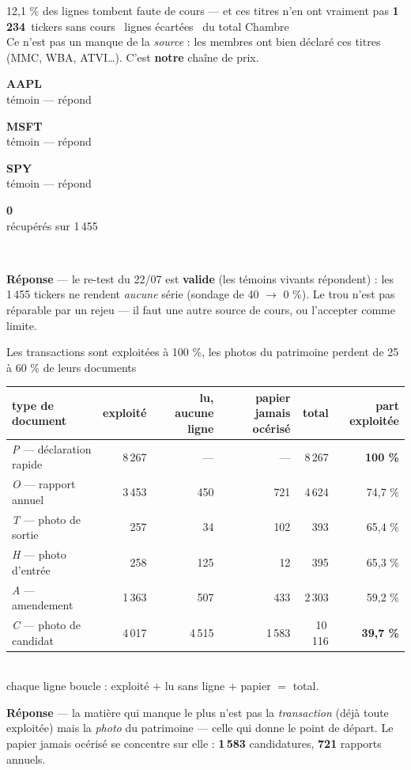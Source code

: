 \documentclass[11pt,aspectratio=169]{beamer}
\newcommand{\kpi}[3]{{\large\textbf{\textcolor{#1}{#2}}}~{\footnotesize #3}}
\newcommand{\tuile}[3]{%
  \begin{minipage}[t]{0.23\textwidth}\centering
    \colorbox{#1}{\parbox[c][20mm][c]{\dimexpr\linewidth-8pt}{\centering
      {\color{white}\Large\textbf{#2}}\\[0.5mm]{\color{white}\footnotesize #3}}}
  \end{minipage}}
\newcommand{\repband}[1]{%
  \colorbox{okgreen!12}{\parbox{\dimexpr\textwidth-10pt}{\scriptsize
    \textbf{\textcolor{okgreen}{Réponse}}\; --- #1}}}
\begin{document}
\begin{frame}{12,1 \% des lignes tombent faute de cours --- et ces titres n'en ont vraiment pas}
  \centering\vspace{1mm}
  \kpi{alertred}{1\,234}{tickers sans cours} \quad \kpi{alertred}{14\,834}{lignes écartées}
  \quad \kpi{alertred}{12,1 \%}{du total Chambre}\\[3mm]
  {\footnotesize Ce n'est pas un manque de la \emph{source} : les membres ont bien déclaré ces titres
  (MMC, WBA, ATVI\ldots). C'est \textbf{notre} chaîne de prix.}\\[4mm]
  \tuile{okgreen}{AAPL}{témoin --- répond}
  \tuile{okgreen}{MSFT}{témoin --- répond}
  \tuile{okgreen}{SPY}{témoin --- répond}
  \tuile{alertred}{0}{récupérés sur 1\,455}\\[3mm]
  \repband{le re-test du 22/07 est \textbf{valide} (les témoins vivants répondent) : les 1\,455
  tickers ne rendent \emph{aucune} série (sondage de 40 $\rightarrow$ 0 \%). Le trou n'est pas
  réparable par un rejeu --- il faut une autre source de cours, ou l'accepter comme limite.}
\end{frame}


\begin{frame}{Les transactions sont exploitées à 100 \%, les photos du patrimoine perdent de 25 à 60 \% de leurs documents}
  \centering
  {\footnotesize\begin{tabular}{l r r r r r}
    \toprule
    type de document & exploité & lu, aucune ligne & papier jamais océrisé & total & part exploitée\\
    \midrule
    \emph{P} --- déclaration rapide & 8\,267 & --- & --- & 8\,267 & \textbf{100 \%}\\
    \emph{O} --- rapport annuel     & 3\,453 & 450 & 721 & 4\,624 & 74,7 \%\\
    \emph{T} --- photo de sortie    & 257 & 34 & 102 & 393 & 65,4 \%\\
    \emph{H} --- photo d'entrée     & 258 & 125 & 12 & 395 & 65,3 \%\\
    \emph{A} --- amendement         & 1\,363 & 507 & 433 & 2\,303 & 59,2 \%\\
    \emph{C} --- photo de candidat  & 4\,017 & 4\,515 & 1\,583 & 10\,116 & \textbf{39,7 \%}\\
    \bottomrule
  \end{tabular}}\\[1mm]
  {\scriptsize\color{black!55} chaque ligne boucle : exploité $+$ lu sans ligne $+$ papier $=$ total.}\\[4mm]
  \repband{la matière qui manque le plus n'est pas la \emph{transaction} (déjà toute exploitée) mais
  la \emph{photo} du patrimoine --- celle qui donne le point de départ. Le papier jamais océrisé se
  concentre sur elle : \textbf{1\,583} candidatures, \textbf{721} rapports annuels.}
\end{frame}
\end{document}
